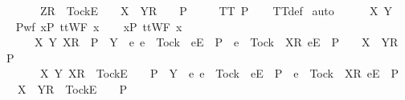 \begin{isabellebody}
\ \ \ \ \ \ \ \ {\isacharbrackleft}Z{\isacharbrackright}\isactrlsub R\ {\isacharhash}\ {\isacharbrackleft}Tock{\isacharbrackright}\isactrlsub E\ {\isacharhash}\ {\isasymrho}\ {\isacharat}\ {\isacharbrackleft}{\isacharbrackleft}X\ {\isasymunion}\ Y{\isacharbrackright}\isactrlsub R{\isacharbrackright}\ {\isacharat}\ {\isasymsigma}\ {\isasymin}\ P{\isacharparenright}{\isacharparenright}\ {\isasymLongrightarrow}\isanewline
\ \ \ \ TT{}\ P{\isachardoublequoteclose}\isanewline
%
\isadelimproof
\ \ %
\endisadelimproof
%
\isatagproof
{}\isamarkupfalse%
\ TT{}{\isacharunderscore}def\isanewline
{}\isamarkupfalse%
\ auto\isanewline
\ \ \isamarkupfalse%
\ {\isasymrho}\ {\isasymsigma}\ X\ Y\isanewline
\ \ \isamarkupfalse%
\ P{\isacharunderscore}wf{\isacharcolon}\ {\isachardoublequoteopen}{\isasymforall}x{\isasymin}P{\isachardot}\ ttWF\ x{\isachardoublequoteclose}\isanewline
\ \ \isamarkupfalse%
\ {\isachardoublequoteopen}{\isasymforall}x{\isasymin}P{\isachardot}\ ttWF\ x\ {\isasymLongrightarrow}\isanewline
\ \ \ \ \ \ \ {\isacharparenleft}{\isasymAnd}X\ Y{\isachardot}\ {\isacharbrackleft}{\isacharbrackleft}X{\isacharbrackright}\isactrlsub R{\isacharbrackright}\ {\isasymin}\ P\ {\isasymand}\ Y\ {\isasyminter}\ {\isacharbraceleft}e{\isachardot}\ e\ {\isasymnoteq}\ Tock\ {\isasymand}\ {\isacharbrackleft}{\isacharbrackleft}e{\isacharbrackright}\isactrlsub E{\isacharbrackright}\ {\isasymin}\ P\ {\isasymor}\ e\ {\isacharequal}\ Tock\ {\isasymand}\ {\isacharbrackleft}{\isacharbrackleft}X{\isacharbrackright}\isactrlsub R{\isacharcomma}\ {\isacharbrackleft}e{\isacharbrackright}\isactrlsub E{\isacharbrackright}\ {\isasymin}\ P{\isacharbraceright}\ {\isacharequal}\ {\isacharbraceleft}{\isacharbraceright}\ {\isasymLongrightarrow}\ {\isacharbrackleft}{\isacharbrackleft}X\ {\isasymunion}\ Y{\isacharbrackright}\isactrlsub R{\isacharbrackright}\ {\isasymin}\ P{\isacharparenright}\ {\isasymLongrightarrow}\isanewline
\ \ \ \ \ \ \ {\isacharparenleft}{\isasymAnd}{\isasymsigma}\ X\ Y{\isachardot}\ {\isacharbrackleft}X{\isacharbrackright}\isactrlsub R\ {\isacharhash}\ {\isacharbrackleft}Tock{\isacharbrackright}\isactrlsub E\ {\isacharhash}\ {\isasymsigma}\ {\isasymin}\ P\ {\isasymand}\ Y\ {\isasyminter}\ {\isacharbraceleft}e{\isachardot}\ e\ {\isasymnoteq}\ Tock\ {\isasymand}\ {\isacharbrackleft}{\isacharbrackleft}e{\isacharbrackright}\isactrlsub E{\isacharbrackright}\ {\isasymin}\ P\ {\isasymor}\ e\ {\isacharequal}\ Tock\ {\isasymand}\ {\isacharbrackleft}{\isacharbrackleft}X{\isacharbrackright}\isactrlsub R{\isacharcomma}\ {\isacharbrackleft}e{\isacharbrackright}\isactrlsub E{\isacharbrackright}\ {\isasymin}\ P{\isacharbraceright}\ {\isacharequal}\ {\isacharbraceleft}{\isacharbraceright}\ {\isasymLongrightarrow}\ {\isacharbrackleft}X\ {\isasymunion}\ Y{\isacharbrackright}\isactrlsub R\ {\isacharhash}\ {\isacharbrackleft}Tock{\isacharbrackright}\isactrlsub E\ {\isacharhash}\ {\isasymsigma}\ {\isasymin}\ P{\isacharparenright}\ {\isasymLongrightarrow}\isanewline

\end{isabellebody}
